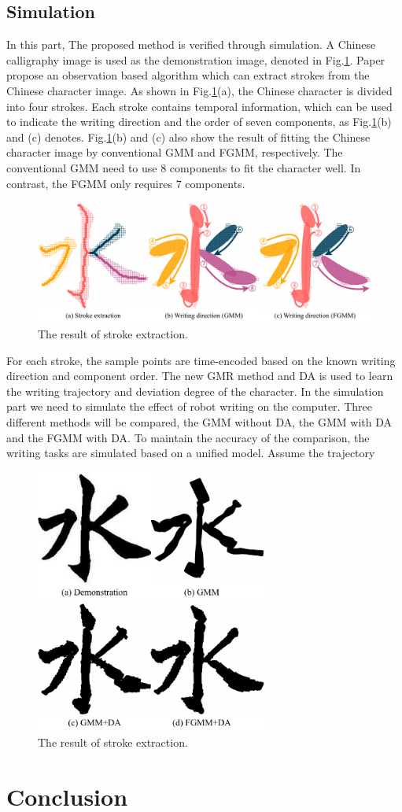 \documentclass[journal]{IEEEtran}
\begin{document}
\subsection{Simulation}
In this part, The proposed method is verified through simulation. A Chinese calligraphy image is used as the demonstration image, denoted in Fig.\ref{fig5}. Paper \cite{Li2022} propose an observation based algorithm which can extract strokes from the Chinese character image. As shown in Fig.\ref{fig5}(a), the Chinese character is divided into four strokes. Each stroke contains temporal information, which can be used to indicate the writing direction and the order of seven components, as Fig.\ref{fig5}(b) and (c) denotes. Fig.\ref{fig5}(b) and (c) also show the result of fitting the Chinese character image by conventional GMM and FGMM, respectively. The conventional GMM need to use 8 components to fit the character well. In contrast, the FGMM only requires 7 components.
\begin{figure}[!t]
    \centering
    \includegraphics[width=6in]{./fig/fig5.pdf}
    \caption{The result of stroke extraction.}
    \label{fig5}
\end{figure}

For each stroke, the sample points are time-encoded based on the known writing direction and component order. The new GMR method and DA is used to learn the writing trajectory and deviation degree of the character. In the simulation part we need to simulate the effect of robot writing on the computer. Three different methods will be compared, the GMM without DA, the GMM with DA and the FGMM with DA. To maintain the accuracy of the comparison, the writing tasks are simulated based on a unified model. Assume the trajectory 

\begin{figure}[!t]
    \centering
    \includegraphics[width=3in]{./fig/fig6.pdf}
    \caption{The result of stroke extraction.}
    \label{fig6}
\end{figure}

\section{Conclusion}


\end{document}
